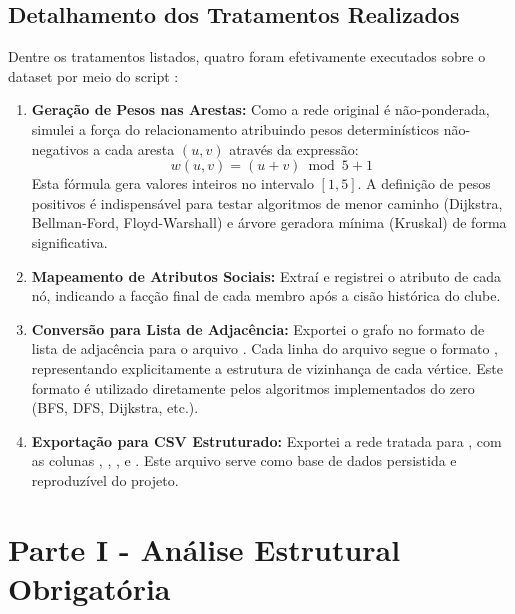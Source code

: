 \documentclass[sigconf]{webmedia}
\begin{document}
\subsection{Detalhamento dos Tratamentos Realizados}

Dentre os tratamentos listados, quatro foram efetivamente executados sobre o dataset por meio do script :

\begin{enumerate}
    \item \textbf{Geração de Pesos nas Arestas:} Como a rede original é não-ponderada, simulei a força do relacionamento atribuindo pesos determinísticos não-negativos a cada aresta $(u, v)$ através da expressão:
    \begin{equation}
        w(u, v) = (u + v) \bmod 5 + 1
    \end{equation}
    Esta fórmula gera valores inteiros no intervalo $[1, 5]$. A definição de pesos positivos é indispensável para testar algoritmos de menor caminho (Dijkstra, Bellman-Ford, Floyd-Warshall) e árvore geradora mínima (Kruskal) de forma significativa.

    \item \textbf{Mapeamento de Atributos Sociais:} Extraí e registrei o atributo  de cada nó, indicando a facção final de cada membro após a cisão histórica do clube.

    \item \textbf{Conversão para Lista de Adjacência:} Exportei o grafo no formato de lista de adjacência para o arquivo . Cada linha do arquivo segue o formato , representando explicitamente a estrutura de vizinhança de cada vértice. Este formato é utilizado diretamente pelos algoritmos implementados do zero (BFS, DFS, Dijkstra, etc.).

    \item \textbf{Exportação para CSV Estruturado:} Exportei a rede tratada para , com as colunas , , ,  e . Este arquivo serve como base de dados persistida e reproduzível do projeto.
\end{enumerate}

\section{Parte I - Análise Estrutural Obrigatória}
\label{sec:parte_i}
\end{document}
